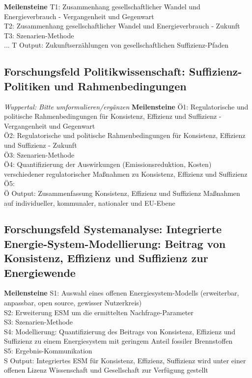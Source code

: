 \documentclass[a4paper,11pt,twoside]{scrartcl}
\begin{document}
\textbf{Meilensteine}
\hline
T1: Zusammenhang gesellschaftlicher Wandel und Energieverbrauch - Vergangenheit und Gegenwart\\
T2: Zusammenhang gesellschaftlicher Wandel und Energieverbrauch - Zukunft\\
T3: Szenarien-Methode\\
...
T Output: Zukunftserzählungen von gesellschaftlichen Suffizienz-Pfaden
\hline

\subsection*{Forschungsfeld Politikwissenschaft: Suffizienz-Politiken und Rahmenbedingungen}
\textit{Wuppertal: Bitte umformulieren/ergänzen}
\textbf{Meilensteine}
\hline
Ö1: Regulatorische und politische Rahmenbedingungen für Konsistenz, Effizienz und Suffizienz - Vergangenheit und Gegenwart\\
Ö2: Regulatorische und politische Rahmenbedingungen für Konsistenz, Effizienz und Suffizienz - Zukunft\\
Ö3: Szenarien-Methode\\
Ö4: Quantifizierung der Auswirkungen (Emissionsreduktion, Kosten) verschiedener regulatorischer Maßnahmen zu Konsistenz, Effizienz und Suffizienz\\
Ö5: \\
Ö Output: Zusammenfassung Konsistenz, Effizienz und Suffizienz Maßnahmen auf individueller, kommunaler, nationaler und EU-Ebene
\hline

\subsection*{Forschungsfeld Systemanalyse: Integrierte Energie-System-Modellierung: Beitrag von Konsistenz, Effizienz und Suffizienz zur Energiewende}

\textbf{Meilensteine}
\hline
S1: Auswahl eines offenen Energiesystem-Modells (erweiterbar, anpassbar, open source, gewisser Nutzerkreis)\\
S2: Erweiterung ESM um die ermittelten Nachfrage-Parameter\\
S3: Szenarien-Methode\\
S4: Modellierung: Quantifizierung des Beitrags von Konsistenz, Effizienz und Suffizienz zu einem Energiesystem mit geringem Anteil fossiler Brennstoffen\\
S5: Ergebnis-Kommunikation\\
S Output: Integriertes ESM für Konsistenz, Effizienz, Suffizienz wird unter einer offenen Lizenz Wissenschaft und Gesellschaft zur Verfügung gestellt
\hline
\end{document}
